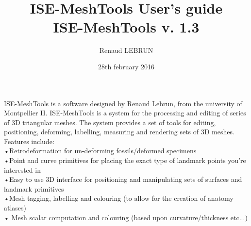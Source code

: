 \documentclass[12pt]{book}
\title{ISE-MeshTools User's guide\\ISE-MeshTools v. 1.3}
\author{Renaud LEBRUN}
\date{28th february 2016}
\begin{document}
	\maketitle
   ISE-MeshTools is a software designed by Renaud Lebrun, from the university of Montpellier II. ISE-MeshTools is a 
system for the processing and editing of series of 3D triangular meshes. The system provides a set of tools for editing, 
positioning, deforming, labelling, measuring and rendering sets of 3D meshes. Features include:\\
•Retrodeformation for un-deforming fossils/deformed specimens\\
•Point and curve primitives for placing the exact type of landmark points you’re interested in\\
•Easy to use 3D interface for positioning and manipulating sets of surfaces and landmark primitives\\
•Mesh tagging, labelling and colouring (to allow for the creation of anatomy atlases)\\
• Mesh scalar computation and colouring (based upon curvature/thickness etc...)

		 
		
   
		
\end{document}
